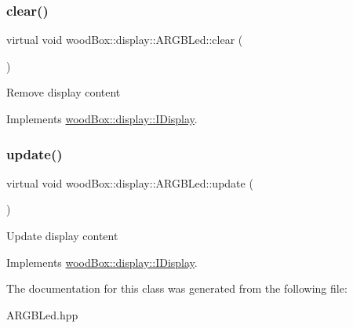 \subsubsection{\texorpdfstring{clear()}{clear()}}
{\footnotesize\ttfamily virtual void wood\+Box\+::display\+::\+A\+R\+G\+B\+Led\+::clear (\begin{DoxyParamCaption}{ }\end{DoxyParamCaption})\hspace{0.3cm}{\ttfamily [pure virtual]}}

Remove display content 

Implements \mbox{\hyperlink{classwood_box_1_1display_1_1_i_display_a7030f0768c1ef15ce936a259406168dc}{wood\+Box\+::display\+::\+I\+Display}}.

\mbox{\label{classwood_box_1_1display_1_1_a_r_g_b_led_ab71f321d91e931f95b96d1f492a9454d}} 
\subsubsection{\texorpdfstring{update()}{update()}}
{\footnotesize\ttfamily virtual void wood\+Box\+::display\+::\+A\+R\+G\+B\+Led\+::update (\begin{DoxyParamCaption}{ }\end{DoxyParamCaption})\hspace{0.3cm}{\ttfamily [pure virtual]}}

Update display content 

Implements \mbox{\hyperlink{classwood_box_1_1display_1_1_i_display_ad8c0811b8b807ce119a06c7806004de7}{wood\+Box\+::display\+::\+I\+Display}}.



The documentation for this class was generated from the following file\+:\begin{DoxyCompactItemize}
\item 
A\+R\+G\+B\+Led.\+hpp\end{DoxyCompactItemize}
